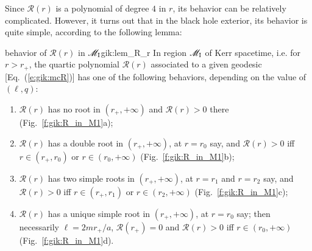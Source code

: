 Since $\mathcal{R}(r)$ is a polynomial of degree $4$ in $r$, its
behavior can be relatively complicated. However, it turns out that in the
black hole exterior, its behavior is quite simple, according to the
following lemma:
\begin{tlemma}{behavior of $\mathcal{R}(r)$ in $\mathscr{M}_{\rm I}$}{gik:lem_R_r}
In region $\mathscr{M}_{\rm I}$ of Kerr spacetime, i.e. for $r> r_+$, the
quartic polynomial $\mathcal{R}(r)$ associated to a given geodesic
[Eq.~(\ref{e:gik:mcR})] has one of the following behaviors, depending
on the value of $(\ell, q)$:
\begin{enumerate}
\item $\mathcal{R}(r)$ has no root in $(r_+,+\infty)$ and $\mathcal{R}(r) > 0$
there (Fig.~\ref{f:gik:R_in_M1}a);
\item $\mathcal{R}(r)$ has a double root in $(r_+,+\infty)$, at $r=r_0$ say, and
$\mathcal{R}(r) > 0$ iff $r\in(r_+, r_0)$ or $r\in(r_0, +\infty)$
(Fig.~\ref{f:gik:R_in_M1}b);
\item $\mathcal{R}(r)$ has two simple roots in $(r_+,+\infty)$, at $r=r_1$ and $r=r_2$ say, and
$\mathcal{R}(r) > 0$ iff $r\in(r_+, r_1)$ or $r\in(r_2, +\infty)$
(Fig.~\ref{f:gik:R_in_M1}c);
\item $\mathcal{R}(r)$ has a unique simple root in $(r_+,+\infty)$, at $r=r_0$ say; then
necessarily $\ell = 2 m r_+ /a$, $\mathcal{R}(r_+) = 0$ and
$\mathcal{R}(r) > 0$ iff $r\in(r_0, +\infty)$
(Fig.~\ref{f:gik:R_in_M1}d).
\end{enumerate}
\end{tlemma}

